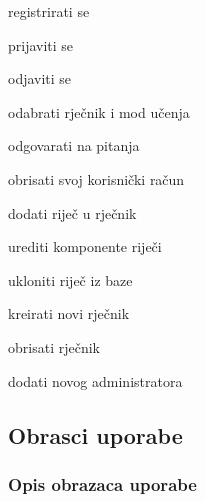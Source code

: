 			
			\begin{packed_enum}
				\item  {}
				
				\begin{packed_enum}
					
					\item registrirati se
					\item prijaviti se
					\item odjaviti se
%						
%				
					\item odabrati rječnik i mod učenja
					\item odgovarati na pitanja
					\item obrisati svoj korisnički račun
					
				\end{packed_enum}
			
				\item  {}
				
				\begin{packed_enum}
					
					\item dodati riječ u rječnik
					\item urediti komponente riječi
					\item ukloniti riječ iz baze
					\item kreirati novi rječnik
					\item obrisati rječnik
					\item dodati novog administratora
										
				\end{packed_enum}
			\end{packed_enum}
			
			\eject 
			
			
				
			\subsection{Obrasci uporabe}
				
				
				\subsubsection{Opis obrazaca uporabe}
					



